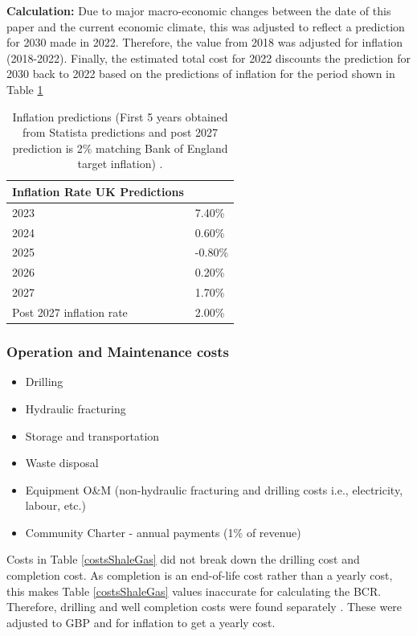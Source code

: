 \documentclass[10pt]{article}
\begin{document}
\textbf{Calculation:}
Due to major macro-economic changes between the date of this paper and the current economic climate, this was adjusted to reflect a prediction for 2030 made in 2022. Therefore, the value from 2018 was adjusted for inflation (2018-2022). Finally, the estimated total cost for 2022 discounts the prediction for 2030 back to 2022 based on the predictions of inflation for the period shown in Table \ref{inflation}
\begin{table}[H]
    \centering
    \begin{tabular}{@{}ll@{}}
        \toprule
        \textbf{Inflation Rate UK Predictions} &         \\
        \midrule
        2023                                   & 7.40\%  \\
        2024                                   & 0.60\%  \\
        2025                                   & -0.80\% \\
        2026                                   & 0.20\%  \\
        2027                                   & 1.70\%  \\
        Post 2027 inflation rate               & 2.00\%  \\
        \bottomrule
    \end{tabular}
    \caption{Inflation predictions (First 5 years obtained from Statista predictions and post 2027 prediction is 2\% matching Bank of England target inflation) \cite{012}.}
    \label{inflation}
\end{table}
\subsubsection{Operation and Maintenance costs}
\begin{itemize}
    \item Drilling
    \item Hydraulic fracturing
    \item Storage and transportation
    \item Waste disposal
    \item Equipment O\&M (non-hydraulic fracturing and drilling costs i.e., electricity, labour, etc.)
    \item Community Charter - annual payments (1\% of revenue)
\end{itemize}
Costs in Table \ref{costsShaleGas} did not break down the drilling cost and completion cost. As completion is an end-of-life cost rather than a yearly cost, this makes Table \ref{costsShaleGas} values inaccurate for calculating the BCR. Therefore, drilling and well completion costs were found separately \cite{MEHANY2019375}. These were adjusted to GBP and for inflation to get a yearly cost.
\end{document}
